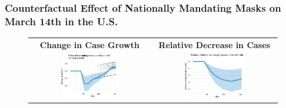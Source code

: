 \documentclass{beamer}
\begin{document}
\begin{frame}
  \frametitle{Counterfactual Effect of Nationally Mandating Masks on March 14th in the U.S. }


\begin{figure}[ht]
  \begin{minipage}{\linewidth}
    \centering 
    \begin{tabular}{cc}
      \textbf{Change in Case Growth} &  \textbf{Relative Decrease in Cases}\\
      \includegraphics[width=0.5\textwidth]{../tables_and_figures/us-mask-dgrowth_idx}
      &
        \includegraphics[width=0.5\textwidth]{../tables_and_figures/us-mask-rel_idx}
    \end{tabular}
  \end{minipage}
\end{figure}



\end{frame}
\end{document}
